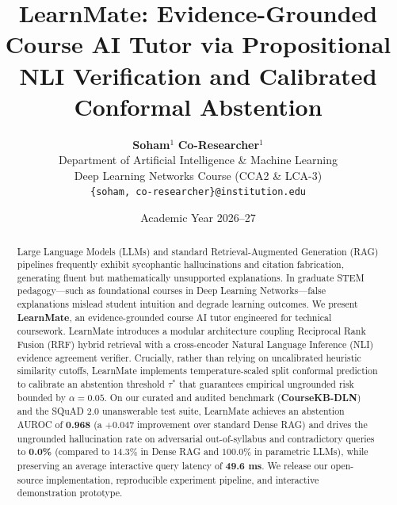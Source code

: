 \documentclass[10pt,twocolumn,letterpaper]{article}
\title{\textbf{LearnMate: Evidence-Grounded Course AI Tutor via Propositional NLI Verification and Calibrated Conformal Abstention}}
\author{
    \textbf{Soham}$^1$ \quad \textbf{Co-Researcher}$^1$ \\
    Department of Artificial Intelligence \& Machine Learning \\
    Deep Learning Networks Course (CCA2 \& LCA-3) \\
    \texttt{\{soham, co-researcher\}@institution.edu}
}
\date{Academic Year 2026--27}
\begin{document}
\maketitle

\begin{abstract}
Large Language Models (LLMs) and standard Retrieval-Augmented Generation (RAG) pipelines frequently exhibit sycophantic hallucinations and citation fabrication, generating fluent but mathematically unsupported explanations. In graduate STEM pedagogy---such as foundational courses in Deep Learning Networks---false explanations mislead student intuition and degrade learning outcomes. We present \textbf{LearnMate}, an evidence-grounded course AI tutor engineered for technical coursework. LearnMate introduces a modular architecture coupling Reciprocal Rank Fusion (RRF) hybrid retrieval with a cross-encoder Natural Language Inference (NLI) evidence agreement verifier. Crucially, rather than relying on uncalibrated heuristic similarity cutoffs, LearnMate implements temperature-scaled split conformal prediction to calibrate an abstention threshold $\tau^*$ that guarantees empirical ungrounded risk bounded by $\alpha = 0.05$. On our curated and audited benchmark (\textbf{CourseKB-DLN}) and the SQuAD 2.0 unanswerable test suite, LearnMate achieves an abstention AUROC of \textbf{0.968} (a $+0.047$ improvement over standard Dense RAG) and drives the ungrounded hallucination rate on adversarial out-of-syllabus and contradictory queries to \textbf{0.0\%} (compared to $14.3\%$ in Dense RAG and $100.0\%$ in parametric LLMs), while preserving an average interactive query latency of \textbf{49.6 ms}. We release our open-source implementation, reproducible experiment pipeline, and interactive demonstration prototype.
\end{abstract}
\end{document}
